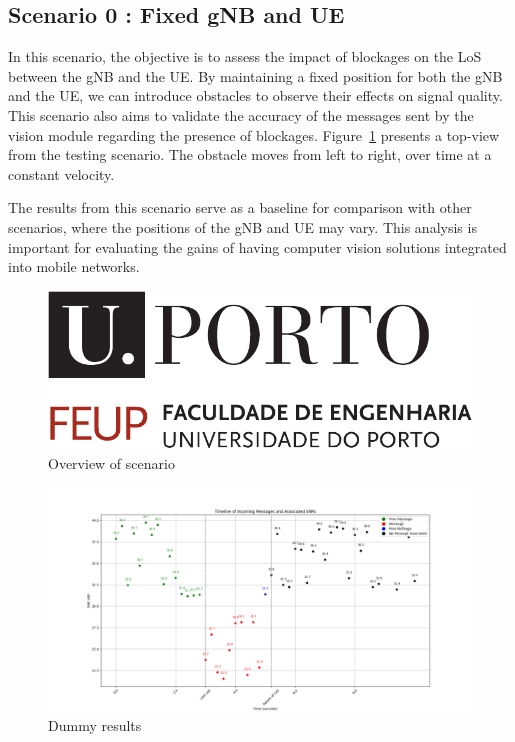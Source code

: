 \subsection{Scenario 0 : Fixed gNB and UE}\label{subsec:scenario-0-:-fixed-gnb-and-ue}

In this scenario, the objective is to assess the impact of blockages on the LoS between the gNB and the UE\@.
By maintaining a fixed position for both the gNB and the UE, we can introduce obstacles to observe their effects on signal quality.
This scenario also aims to validate the accuracy of the messages sent by the vision module regarding the presence of blockages.
Figure~\ref{fig:test_fixed} presents a top-view from the testing scenario.
The obstacle moves from left to right, over time at a constant velocity.

The results from this scenario serve as a baseline for comparison with other scenarios, where the positions of the gNB and UE may vary.
This analysis is important for evaluating the gains of having computer vision solutions integrated into mobile networks.

\begin{figure}[H]
    \centering
    \includegraphics[width=0.5\linewidth]{figures/uporto-feup}
    \caption{Overview of scenario}
    \label{fig:test_fixed}
\end{figure}

\begin{figure}[H]
    \centering
    \includegraphics[width=\linewidth]{figures/dummy results}
    \caption{Dummy results}
    \label{fig:results_0}
\end{figure}


